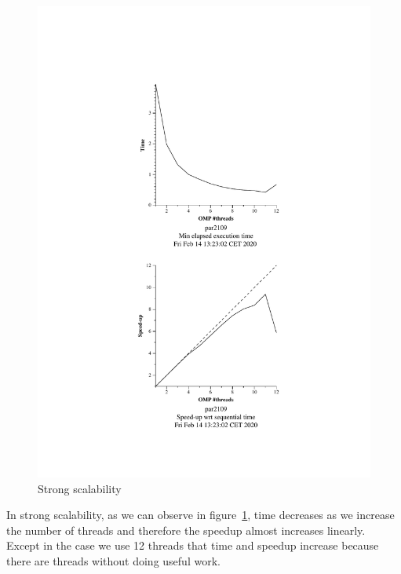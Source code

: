 \begin{figure}[H]%
    \caption{Strong scalability}%
    \label{fig:strong}
    \centering
    \includegraphics[width=\textwidth]{./data/pi/pi_omp-1000000000-1-12-3-strong-boada-2.pdf}
\end{figure}

In strong scalability, as we can observe in figure~\ref{fig:strong}, time decreases as we increase the number of threads and therefore the speedup almost increases linearly. Except in the case we use 12 threads that time and speedup increase because there are threads without doing useful work.

